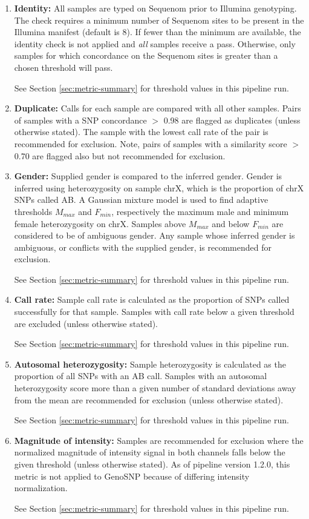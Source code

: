 \begin{enumerate}
\item \textbf{Identity:}  All samples are typed on Sequenom prior to Illumina genotyping.  The check requires a minimum number of Sequenom sites to be present in the Illumina manifest (default is 8). If fewer than the minimum are available, the identity check is not applied and \emph{all} samples receive a pass. Otherwise, only samples for which concordance on the Sequenom sites is greater than a chosen threshold will pass.

See Section \ref{sec:metric-summary} for threshold values in this pipeline run.

\item \textbf{Duplicate:}  Calls for each sample are compared with all other samples.  Pairs of samples with a SNP concordance $>$ 0.98 are flagged as duplicates (unless otherwise stated).  The sample with the lowest call rate of the pair is recommended for exclusion.  Note, pairs of samples with a similarity score $>$ 0.70 are flagged also but not recommended for exclusion.

\item \textbf{Gender:} Supplied gender is compared to the inferred gender. Gender is inferred using heterozygosity on sample chrX, which is the proportion of chrX SNPs called AB. A Gaussian mixture model is used to find adaptive thresholds $M_{max}$ and $F_{min}$, respectively the maximum male and minimum female heterozygosity on chrX.  Samples above $M_{max}$ and below $F_{min}$ are considered to be of ambiguous gender.  Any sample whose inferred gender is ambiguous, or conflicts with the supplied gender, is recommended for exclusion.

See Section \ref{sec:metric-summary} for threshold values in this pipeline run.

\item \textbf{Call rate:} Sample call rate is calculated as the proportion of SNPs called successfully for that sample.  Samples with call rate below a given threshold are excluded (unless otherwise stated). 

See Section \ref{sec:metric-summary} for threshold values in this pipeline run.

\item \textbf{Autosomal heterozygosity:}  Sample heterozygosity is calculated as the proportion of all SNPs with an AB call.  Samples with an autosomal heterozygosity score more than a given number of standard deviations away from the mean are recommended for exclusion (unless otherwise stated).  

See Section \ref{sec:metric-summary} for threshold values in this pipeline run.

\item \textbf{Magnitude of intensity:} Samples are recommended for exclusion where the normalized magnitude of intensity signal in both channels falls below the given threshold (unless otherwise stated). As of pipeline version 1.2.0, this metric is not applied to GenoSNP because of differing intensity normalization.

See Section \ref{sec:metric-summary} for threshold values in this pipeline run.
\end{enumerate}
